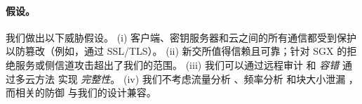 \paragraph{假设。}
我们做出以下威胁假设。 (i) 客户端、密钥服务器和云之间的所有通信都受到保护以防篡改（例如，通过 SSL/TLS）。 (ii) 新交所值得信赖且可靠；针对 SGX \cite{bulck18, oleksenko18} 的拒绝服务或侧信道攻击超出了我们的范围。 (iii) 我们可以通过远程审计 \cite{ateniese07, juels07} 和 {\em 容错} 通过多云方法 \cite{li15} 实现 {\em 完整性}。 (iv) 我们不考虑流量分析 \cite{zuo18}、频率分析 \cite{li20b} 和块大小泄漏 \cite{ritzdorf16}，而相关的防御 \cite{zuo18,li20b,ritzdorf16} 与我们的设计兼容。